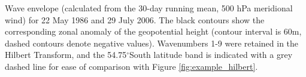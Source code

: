 \label{fig:example_envelope}
Wave envelope (calculated from the 30-day running mean, 500 hPa meridional wind) for 22 May 1986 and 29 July 2006. The black contours show the corresponding zonal anomaly of the geopotential height (contour interval is 60m, dashed contours denote negative values). Wavenumbers 1-9 were retained in the Hilbert Transform, and the 54.75$^{\circ}$South latitude band is indicated with a grey dashed line for ease of comparison with Figure \ref{fig:example_hilbert}. 